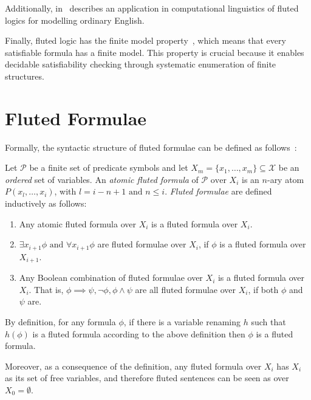 Additionally, in~\cite{purdy1999quine} \citeauthor{purdy1999quine} describes an application in computational linguistics of fluted logics for
modelling ordinary English.

Finally, fluted logic has the finite model property~\cite{purdy1996decidability,purdy1996fluted,purdy1999quine}, which means that every satisfiable formula has a finite model.
This property is crucial because it enables decidable satisfiability checking through systematic enumeration of finite structures.

\section{Fluted Formulae}\label{sec:fluted-formulae}

Formally, the syntactic structure of fluted formulae can be defined as follows~\cite{schmidt2000resolution}:

\begin{definition}\label{def:fluted-formulae}
  Let \(\mathcal{P}\) be a finite set of predicate symbols and let \(X_m = \{x_1, \ldots, x_m\} \subseteq \mathcal{X}\) be an \emph{ordered} set of variables.
  An \emph{atomic fluted formula} of \(\mathcal{P} \text{ over } X_i\) is an \(n\)-ary atom \(P(x_l,\ldots, x_i)\), with \(l = i - n + 1 \text{ and } n \leq i\).
  \emph{Fluted formulae} are defined inductively as follows:
  \begin{enumerate}
    \item Any atomic fluted formula over \(X_i\) is a fluted formula over \(X_i\).
    \item \(\exists x_{i+1}\phi \text{ and } \forall x_{i+1}\phi\) are fluted formulae over \(X_{i}\), if \(\phi\) is a fluted formula over \(X_{i+1}\).
    \item Any Boolean combination of fluted formulae over \(X_i\) is a fluted formula over \(X_i\). That is, \(\phi \implies \psi, \neg \phi, \phi \land \psi\) are all fluted formulae over \(X_i\), if both \(\phi\) and \(\psi\) are.
  \end{enumerate}
\end{definition}

By definition, for any formula \(\phi\), if there is a variable renaming \(h\) such that \(h(\phi)\) is a fluted formula according to the above definition then \(\phi\) is a fluted formula.

Moreover, as a consequence of the definition, any fluted formula over \(X_i\) has \(X_i\) as its set of free variables, and therefore fluted sentences can be seen as over \(X_0 = \emptyset\).


